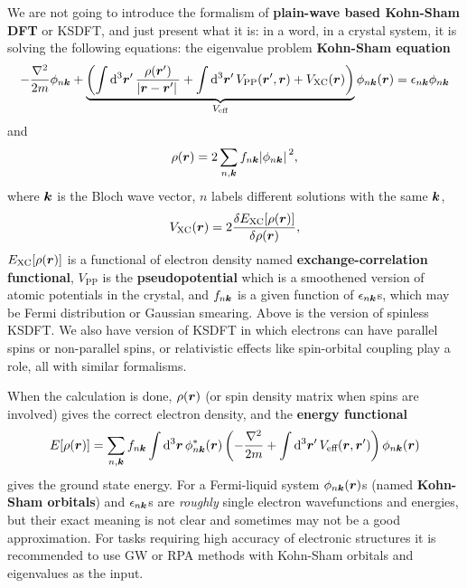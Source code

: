 \documentclass[hyperref, a4paper]{article}
\newcommand*{\concept}[1]{{\textbf{#1}}}
\begin{document}
We are not going to introduce the formalism of \concept{plain-wave based Kohn-Sham DFT} or KSDFT, and just present what it is: in a word,  in a crystal system, it is solving the following equations: the eigenvalue problem \concept{Kohn-Sham equation}
\begin{equation}
    - \frac{\laplacian}{2m} \phi_{n \vb*{k}} + \underbrace{\left( \int \dd[3]{\vb*{r}'} \frac{\rho(\vb*{r}')}{\abs*{\vb*{r} - \vb*{r}'}} + \int \dd[3]{\vb*{r}'} V_\text{PP}(\vb*{r}', \vb*{r}) + V_\text{XC}(\vb*{r}) \right)}_{V_\text{eff}} \phi_{n \vb*{k}}(\vb*{r}) = \epsilon_{n \vb*{k}} \phi_{n \vb*{k}}
\end{equation}
and
\begin{equation}
    \rho(\vb*{r}) = 2 \sum_{n, \vb*{k}} f_{n \vb*{k}} \abs*{\phi_{n \vb*{k}}}^2,
\end{equation}
where $\vb*{k}$ is the Bloch wave vector, $n$ labels different solutions with the same $\vb*{k}$,
\begin{equation}
    V_\text{XC}(\vb*{r}) = 2 \fdv{E_\text{XC}[\rho(\vb*{r})]}{\rho(\vb*{r})},
\end{equation}
$E_\text{XC}[\rho(\vb*{r})]$ is a functional of electron density named \concept{exchange-correlation functional}, 
$V_\text{PP}$ is the \concept{pseudopotential} which is a smoothened version of atomic potentials in the crystal,
and $f_{n \vb*{k}}$ is a given function of $\epsilon_{n \vb*{k}}$s, which may be Fermi distribution or Gaussian smearing.
Above is the version of spinless KSDFT. We also have version of KSDFT in which electrons can have parallel spins or non-parallel spins, or relativistic effects like spin-orbital coupling play a role, all with similar formalisms.

When the calculation is done, $\rho(\vb*{r})$ (or spin density matrix when spins are involved) gives the correct electron density, and the \concept{energy functional}
\begin{equation}
    E[\rho(\vb*{r})] = \sum_{n, \vb*{k}} f_{n \vb*{k}} \int \dd[3]{\vb*{r}} \phi_{n \vb*{k}}^*(\vb*{r}) \left( - \frac{\laplacian}{2m  } + \int \dd[3]{\vb*{r}'} V_\text{eff}(\vb*{r}, \vb*{r}') \right) \phi_{n \vb*{k}}(\vb*{r}) 
\end{equation}
gives the ground state energy.
For a Fermi-liquid system $\phi_{n \vb*{k}}(\vb*{r})$s (named \concept{Kohn-Sham orbitals}) and $\epsilon_{n \vb*{k}}$s are \emph{roughly} single electron wavefunctions and energies, but their exact meaning is not clear and sometimes may not be a good approximation.
For tasks requiring high accuracy of electronic structures it is recommended to use GW or RPA methods with Kohn-Sham orbitals and eigenvalues as the input.
\end{document}
